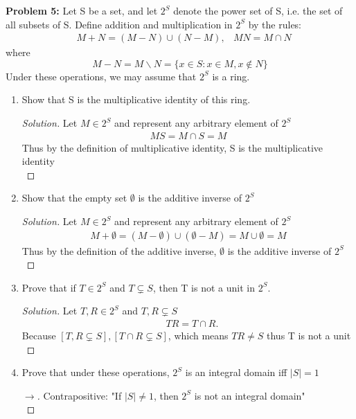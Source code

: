 \documentclass[12pt]{article}
\begin{document}
\newpage
\noindent \textbf{Problem 5: } Let S be a set, and let $2^S$ denote the power set of S, i.e. the set of all subsets of S. Define addition and multiplication in $2^S$ by the rules: 
	\begin{align*}
		&M + N = (M - N) \cup (N - M), &MN = M \cap N
	\end{align*}
where 
	$$ M - N = M \backslash N = \{ x \in S: x \in M, x \not \in N\} $$
Under these operations, we may assume that $2^S$ is a ring. \\
	\begin{enumerate}[label = (\alph*)]
		\item Show that S is the multiplicative identity of this ring.
		\begin{proof}[Solution]
			Let $M \in 2^S$ and represent any arbitrary element of $2^S$
			\begin{align*}
				MS = M \cap S = M
			\end{align*}
		Thus by the definition of multiplicative identity, S is the multiplicative identity \\
		\end{proof}
		\item Show that the empty set $\emptyset$ is the additive inverse of $2^S$
		\begin{proof}[Solution]
			Let $M \in 2^S$ and represent any arbitrary element of $2^S$
			\begin{align*}
				M + \emptyset = (M - \emptyset) \cup (\emptyset - M) = M \cup \emptyset = M
			\end{align*}
			Thus by the definition of the additive inverse, $\emptyset$ is the additive inverse of $2^S$ \\
		\end{proof}
		\item Prove that if $T \in 2^S$ and $T \subsetneq S$, then T is not a unit in $2^S$.
			\begin{proof}[Solution]
				Let $T,R \in 2^S$ and $T,R \subsetneq S$
				\begin{align*}
					&TR = T \cap R. 
				\end{align*}
				Because $[T,R \subsetneq S], [T \cap R \subsetneq S]$, which means $TR \not = S$ thus T is not a unit \\
			\end{proof}
		\newpage
		\item Prove that under these operations, $2^S$ is an integral domain iff $|S| = 1$
			\begin{proof}[$\rightarrow$]
				Contrapositive: "If $|S| \not = 1$, then $2^S$ is not an integral domain" \\

\end{proof}
\end{enumerate}
\end{document}
